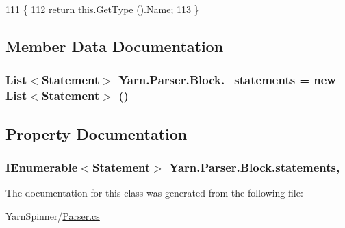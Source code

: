 \begin{DoxyCode}
111             \{
112                 \textcolor{keywordflow}{return} this.GetType ().Name;
113             \}
\end{DoxyCode}


\subsection{Member Data Documentation}
\hypertarget{a00022_ad79f9582e55ec75b68fd72ffcae0f41b}{
\subsubsection[{\-\_\-statements}]{\setlength{\rightskip}{0pt plus 5cm}List$<${\bf Statement}$>$ Yarn.\-Parser.\-Block.\-\_\-statements = new List$<${\bf Statement}$>$ ()\hspace{0.3cm}{\ttfamily [private]}}}\label{a00022_ad79f9582e55ec75b68fd72ffcae0f41b}


\subsection{Property Documentation}
\hypertarget{a00022_a42e3d555bbd5ecbdf61c45ad715be7e1}{
\subsubsection[{statements}]{\setlength{\rightskip}{0pt plus 5cm}I\-Enumerable$<${\bf Statement}$>$ Yarn.\-Parser.\-Block.\-statements\hspace{0.3cm}{\ttfamily [get]}, {\ttfamily [package]}}}\label{a00022_a42e3d555bbd5ecbdf61c45ad715be7e1}


The documentation for this class was generated from the following file\-:\begin{DoxyCompactItemize}
\item 
Yarn\-Spinner/\hyperlink{a00122}{Parser.\-cs}\end{DoxyCompactItemize}
